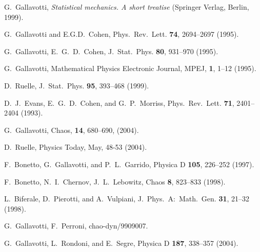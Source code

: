 \documentclass[pre,aps]{revtex4}
\begin{document}
\begin{thebibliography}{99}





 G.~Gallavotti, {\it Statistical mechanics. A short treatise}
(Springer Verlag, Berlin, 1999).

 G.~Gallavotti and E.G.D.~Cohen,
Phys.~Rev.~Lett. {\bf 74}, 2694--2697 (1995).

 G.~Gallavotti, E.~G.~D.~Cohen, 
J.~Stat.~Phys. {\bf 80}, 931--970 (1995).

 G.~Gallavotti, 
Mathematical Physics Electronic Journal, MPEJ, {\bf 1}, 1--12 (1995).

 D.~Ruelle, 
J.~Stat.~Phys. {\bf 95}, 393--468 (1999).

 D.~J.~Evans, E.~G.~D.~Cohen, and G.~P.~Morriss,
Phys.~Rev.~Lett. {\bf 71}, 2401--2404 (1993).

 G.~Gallavotti, 
Chaos, {\bf 14}, 680--690, (2004).

 D.~Ruelle, 
Physics Today, May, 48-53 (2004).

 F.~Bonetto, G.~Gallavotti, and P.~L.~Garrido, 
Physica D {\bf 105}, 226--252 (1997).

 F.~Bonetto, N.~I.~Chernov, J.~L.~Lebowitz,
Chaos {\bf 8}, 823--833 (1998).

 L.~Biferale, D.~Pierotti, and A.~Vulpiani,
J.~Phys.~A:~Math.~Gen. {\bf 31}, 21--32 (1998).

 G.~Gallavotti, F.~Perroni,
chao-dyn/9909007.

 G.~Gallavotti, L.~Rondoni, and E.~Segre,
Physica D {\bf 187}, 338--357 (2004).


\end{thebibliography}
\end{document}

